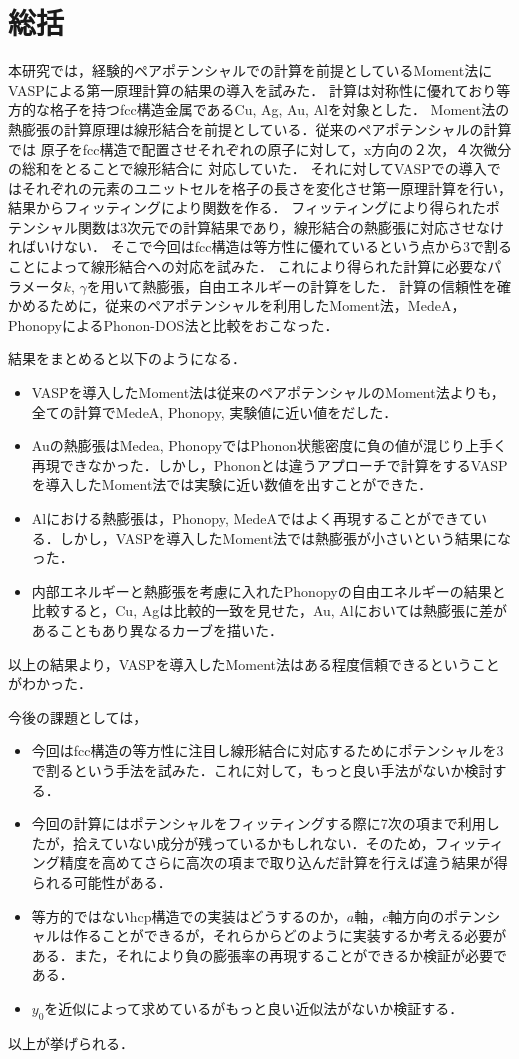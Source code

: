 \chapter{総括}
本研究では，経験的ペアポテンシャルでの計算を前提としているMoment法にVASPによる第一原理計算の結果の導入を試みた．
計算は対称性に優れており等方的な格子を持つfcc構造金属であるCu, Ag, Au, Alを対象とした．
Moment法の熱膨張の計算原理は線形結合を前提としている．従来のペアポテンシャルの計算では
原子をfcc構造で配置させそれぞれの原子に対して，x方向の２次，４次微分の総和をとることで線形結合に
対応していた．
それに対してVASPでの導入ではそれぞれの元素のユニットセルを格子の長さを変化させ第一原理計算を行い，結果からフィッティングにより関数を作る．
フィッティングにより得られたポテンシャル関数は3次元での計算結果であり，線形結合の熱膨張に対応させなければいけない．
そこで今回はfcc構造は等方性に優れているという点から3で割ることによって線形結合への対応を試みた．
これにより得られた計算に必要なパラメータ$k$, $\gamma$を用いて熱膨張，自由エネルギーの計算をした．
計算の信頼性を確かめるために，従来のペアポテンシャルを利用したMoment法，MedeA，PhonopyによるPhonon-DOS法と比較をおこなった．

結果をまとめると以下のようになる．
\begin{itemize}
 \item VASPを導入したMoment法は従来のペアポテンシャルのMoment法よりも，全ての計算でMedeA, Phonopy, 実験値に近い値をだした．
 \item Auの熱膨張はMedea, PhonopyではPhonon状態密度に負の値が混じり上手く再現できなかった．しかし，Phononとは違うアプローチで計算をするVASPを導入したMoment法では実験に近い数値を出すことができた．
  \item Alにおける熱膨張は，Phonopy, MedeAではよく再現することができている．しかし，VASPを導入したMoment法では熱膨張が小さいという結果になった．
 \item 内部エネルギーと熱膨張を考慮に入れたPhonopyの自由エネルギーの結果と比較すると，Cu, Agは比較的一致を見せた，Au, Alにおいては熱膨張に差があることもあり異なるカーブを描いた．
\end{itemize}
以上の結果より，VASPを導入したMoment法はある程度信頼できるということがわかった．

今後の課題としては，

\begin{itemize}
 \item 今回はfcc構造の等方性に注目し線形結合に対応するためにポテンシャルを3で割るという手法を試みた．これに対して，もっと良い手法がないか検討する．
 \item 今回の計算にはポテンシャルをフィッティングする際に7次の項まで利用したが，拾えていない成分が残っているかもしれない．そのため，フィッティング精度を高めてさらに高次の項まで取り込んだ計算を行えば違う結果が得られる可能性がある．
  \item 等方的ではないhcp構造での実装はどうするのか，$a$軸，$c$軸方向のポテンシャルは作ることができるが，それらからどのように実装するか考える必要がある．また，それにより負の膨張率の再現することができるか検証が必要である．
  \item $y_0$を近似によって求めているがもっと良い近似法がないか検証する．
\end{itemize}
以上が挙げられる．




